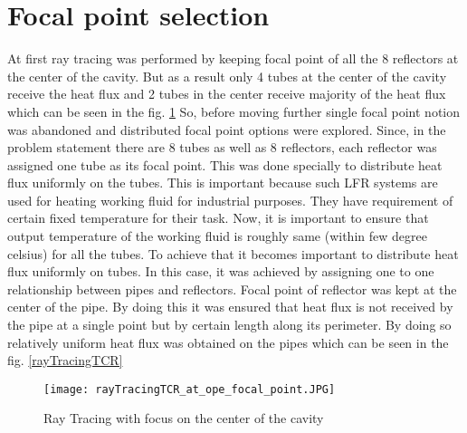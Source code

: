\section{Focal point selection}
At first ray tracing was performed by keeping focal point of all the 8 reflectors at the center of the cavity. But as a result only 4 tubes at the center of the cavity receive the heat flux and 2 tubes in the center receive majority of the  heat flux which can be seen in the fig. \ref{rayTracingTCR_at_ope_focal_point}  So, before moving further single focal point notion was abandoned and distributed focal point options were explored. Since, in the problem statement there are 8 tubes as well as 8 reflectors, each reflector was assigned one tube as its focal point. This was done specially to distribute heat flux uniformly on the tubes. This is important because such LFR systems are used for heating working fluid for industrial purposes. They have requirement of certain fixed temperature for their task. Now, it is important to ensure that output temperature of the working fluid is roughly same (within few degree celsius) for all the tubes. To achieve that it becomes important to distribute heat flux uniformly on tubes. In this case, it was achieved by assigning one to one relationship between pipes and reflectors. Focal point of reflector was kept at the center of the pipe. By doing this it was ensured that heat flux is not received by the pipe at a single point but by certain length along its perimeter. By doing so relatively uniform heat flux was obtained on the pipes which can be seen in the fig. \ref{rayTracingTCR}

\begin{figure}[H]
\begin{center}
  \texttt{[image: rayTracingTCR\_at\_ope\_focal\_point.JPG]}
\caption{Ray Tracing with focus on the center of the cavity}
\end{center}
\label{rayTracingTCR_at_ope_focal_point}
\end{figure}

